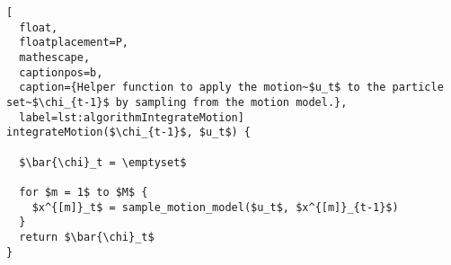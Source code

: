\begin{lstlisting}[
  float,
  floatplacement=P,
  mathescape,
  captionpos=b,
  caption={Helper function to apply the motion~$u_t$ to the particle set~$\chi_{t-1}$ by sampling from the motion model.},
  label=lst:algorithmIntegrateMotion]
integrateMotion($\chi_{t-1}$, $u_t$) {

  $\bar{\chi}_t = \emptyset$

  for $m = 1$ to $M$ {
    $x^{[m]}_t$ = sample_motion_model($u_t$, $x^{[m]}_{t-1}$)
  }
  return $\bar{\chi}_t$
}
\end{lstlisting}
